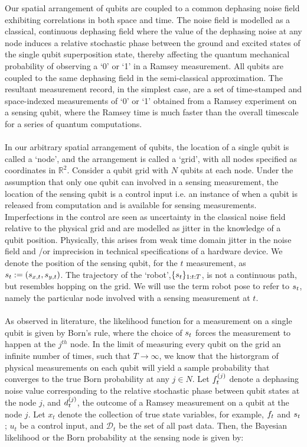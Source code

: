 Our spatial arrangement of qubits are coupled to a common dephasing noise field exhibiting correlations in both space and time. The noise field is modelled as a classical, continuous dephasing field where the value of the dephasing noise at any node induces a relative stochastic phase between the ground and excited states of the single qubit superposition state, thereby affecting the  quantum mechanical probability of observing a  `0' or `1' in a Ramsey measurement. All qubits are coupled to the same dephasing field in the semi-classical approximation. The resultant measurement record, in the simplest case, are a set of time-stamped and space-indexed measurements of `0' or `1' obtained from a Ramsey experiment on a sensing qubit, where the Ramsey time is much faster than the overall timescale for a series of quantum computations. \\
\\
In our arbitrary spatial arrangement of qubits, the location of a single qubit is called a `node', and the arrangement is called a `grid', with all nodes specified as coordinates in $\mathbb{R}^2$. Consider a qubit grid with $N$ qubits at each node. Under the assumption that only one qubit can involved in a sensing measurement, the location of the sensing qubit is a control input i.e. an instance of when a qubit is released from computation and is available for sensing measurements. Imperfections in the control are seen as uncertainty in the classical noise field relative to the physical grid and are modelled as jitter in the knowledge of a qubit position. Physically, this arises from weak time domain jitter in the noise field and /or imprecision in technical specifications of a hardware device. We denote the position of the sensing qubit, for the $t$ measurement, as $s_{ t}:= (s_{ x,t}, s_{ y,t})$.  The trajectory of the `robot',$\{s_{ t}\}_{1:t:T}$, is not a continuous path, but resembles hopping on the grid. We will use the term robot pose to refer to $s_{ t}$, namely the particular node involved with a sensing measurement at $t$.\\
\\
As observed in literature, the likelihood function for a measurement on a single qubit is given by Born's rule, where the choice of $s_{ t}$ forces the measurement to happen at the $j^{th}$ node. In the limit of measuring every qubit on the grid an infinite number of times, such that $T \to \infty$, we know that the historgram of physical measurements on each qubit will yield a sample probability that converges to the true Born probability at any $j \in N$. Let $f^{( j )}_{t}$ denote a  dephasing noise value corresponding to the relative stochastic phase between qubit states at the node $j$, and $d^{( j )}_{t}$, the outcome of a Ramsey measurement on a qubit at the node $j$. Let $x_t$ denote the collection of true state variables, for example, $f_{ t}$ and $s_{ t}$; $u_t$ be a control input, and $\mathcal{D}_t$ be the set of all past data. Then, the Bayesian likelihood or the Born probability at the sensing node is given by:

